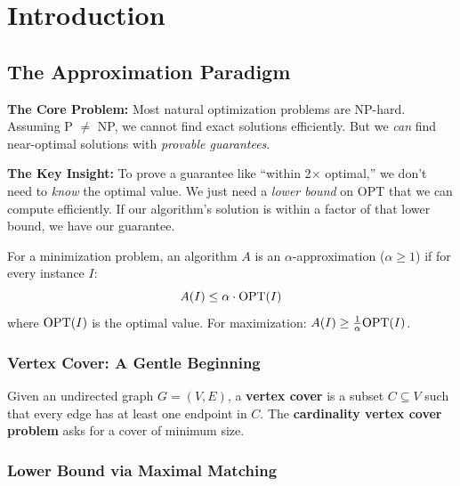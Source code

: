 \setcounter{chapter}{0}
\chapter{Introduction}
\label{ch:intro}

\section{The Approximation Paradigm}

\begin{intuitionbox}
\textbf{The Core Problem:} Most natural optimization problems are NP-hard. Assuming P $\neq$ NP, we cannot find exact solutions efficiently. But we \emph{can} find near-optimal solutions with \emph{provable guarantees}.

\textbf{The Key Insight:} To prove a guarantee like ``within 2$\times$ optimal,'' we don't need to \emph{know} the optimal value. We just need a \emph{lower bound} on OPT that we can compute efficiently. If our algorithm's solution is within a factor of that lower bound, we have our guarantee.
\end{intuitionbox}

\begin{definition}
For a minimization problem, an algorithm $A$ is an $\alpha$-approximation ($\alpha \geq 1$) if for every instance $I$:
\[
A(I) \leq \alpha \cdot \mathrm{OPT}(I)
\]
where $\mathrm{OPT}(I)$ is the optimal value. For maximization: $A(I) \geq \frac{1}{\alpha}\mathrm{OPT}(I)$.
\end{definition}

\subsection{Vertex Cover: A Gentle Beginning}

\begin{definition}
Given an undirected graph $G = (V, E)$, a \textbf{vertex cover} is a subset $C \subseteq V$ such that every edge has at least one endpoint in $C$. The \textbf{cardinality vertex cover problem} asks for a cover of minimum size.
\end{definition}

\subsection{Lower Bound via Maximal Matching}


